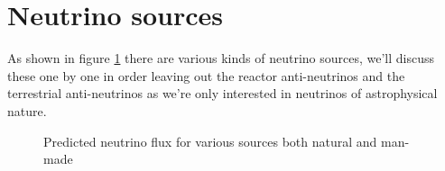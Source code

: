 \documentclass[11pt,a4paper,faculty=we,language=en,doctype=report]{cls/ugent-doc}
\begin{document}
\section{Neutrino sources}
As shown in figure \ref{figure:Neutrino fluxes} there are various kinds of
neutrino sources, we'll discuss these one by one in order leaving out the
reactor anti-neutrinos and the terrestrial anti-neutrinos as we're only
interested in neutrinos of astrophysical nature.
\begin{figure}
	\centering
	\caption{Predicted neutrino flux for various sources both natural and man-made}
	\label{figure:Neutrino fluxes}
\end{figure}
\end{document}
